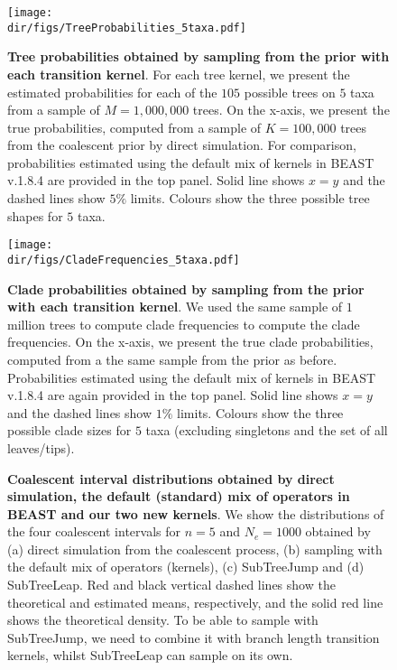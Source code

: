 \begin{figure}[!ht]
\centering
\texttt{[image: \\dir/figs/TreeProbabilities\_5taxa.pdf]}
\caption[Tree probabilities obtained by sampling from the prior with each transition kernel.]{\textbf{Tree probabilities obtained by sampling from the prior with each transition kernel}.
For each tree kernel, we present the estimated probabilities for each of the $105$ possible trees on $5$ taxa from a sample of $M = 1, 000, 000$  trees.
On the x-axis, we present the true probabilities, computed from a sample of $K = 100, 000$ trees from the coalescent prior by direct simulation.
For comparison, probabilities estimated using the default mix of kernels in BEAST v.1.8.4 are provided in the top panel.
Solid line shows $x=y$ and the dashed lines show $5\%$ limits.
Colours show the three possible tree shapes for $5$ taxa.
}
\label{fig:treeP}
\end{figure}
\begin{figure}[!ht]
\centering
\texttt{[image: \\dir/figs/CladeFrequencies\_5taxa.pdf]}
\caption[Clade probabilities obtained by sampling from the prior with each transition kernel.]{\textbf{Clade probabilities obtained by sampling from the prior with each transition kernel}.
We used the same sample of $1$ million trees to compute clade frequencies to compute the clade frequencies.
On the x-axis, we present the true clade probabilities, computed from a the same sample from the prior as before.
Probabilities estimated using the default mix of kernels in BEAST v.1.8.4 are again provided in the top panel.
Solid line shows $x=y$ and the dashed lines show $1\%$ limits.
Colours show the three possible clade sizes for $5$ taxa (excluding singletons and the set of all leaves/tips).
}
\label{fig:cladeP}
\end{figure}
\begin{figure}
\begin{center}
\end{center}
\caption[Coalescent interval distributions obtained by direct simulation, the default (standard) mix of operators in BEAST and our two new kernels.]{\textbf{Coalescent interval distributions obtained by direct simulation, the default (standard) mix of operators in BEAST and our two new kernels}.
We show the distributions of the four coalescent intervals for $n = 5$ and $N_e = 1000$  obtained by (a) direct simulation from the coalescent process, (b) sampling with the default mix of operators (kernels), (c) SubTreeJump and (d) SubTreeLeap.
Red and black vertical dashed lines show the theoretical and estimated means, respectively, and the solid red line shows the theoretical density. 
To be able to sample with SubTreeJump, we need to combine it with branch length transition kernels, whilst SubTreeLeap can sample on its own.}
\label{fig:coalIntervals}
\end{figure}
